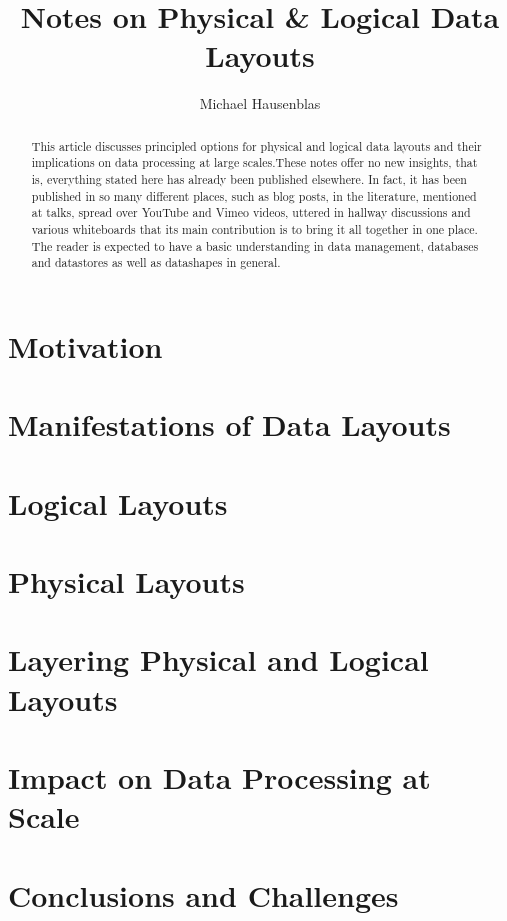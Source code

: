 \documentclass{llncs}
\begin{document}
\title{Notes on Physical \& Logical Data Layouts}
	\author{
	Michael Hausenblas 
	}
\maketitle

\begin{abstract}
This article discusses principled options for physical and logical data layouts
and their implications on data processing at large scales.These notes offer no
new insights, that is, everything stated here has already been published 
elsewhere. In fact, it has been published in so many different places, such as
blog posts, in the literature, mentioned at talks, spread over YouTube and Vimeo
videos, uttered in hallway discussions and various whiteboards that its main
contribution is to bring it all together in one place. The reader is expected to
have a basic understanding in data management, databases and datastores as well 
as datashapes in general.\end{abstract}

\section{Motivation}
\label{sec:mot}

\section{Manifestations of Data Layouts}
\label{sec:mani}

\section{Logical Layouts}
\label{sec:loglay}

\section{Physical Layouts}
\label{sec:phylay}

\section{Layering Physical and Logical Layouts}
\label{sec:laylay}


\section{Impact on Data Processing at Scale}
\label{sec:ldp}


\section{Conclusions and Challenges}
\label{sec:concl}




\end{document}

